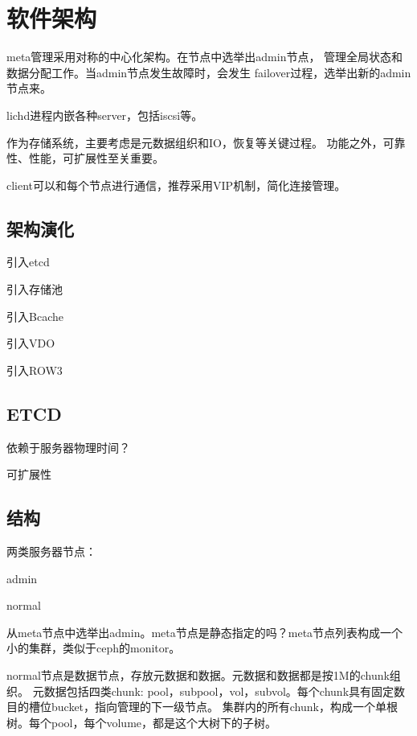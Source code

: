 \chapter{软件架构}

meta管理采用对称的中心化架构。在节点中选举出admin节点，
管理全局状态和数据分配工作。当admin节点发生故障时，会发生
failover过程，选举出新的admin节点来。

lichd进程内嵌各种server，包括iscsi等。

作为存储系统，主要考虑是元数据组织和IO，恢复等关键过程。
功能之外，可靠性、性能，可扩展性至关重要。

client可以和每个节点进行通信，推荐采用VIP机制，简化连接管理。

\section{架构演化}

\begin{enumbox}
\item{引入etcd}
\item{引入存储池}
\item{引入Bcache}
\item{引入VDO}
\item{引入ROW3}
\end{enumbox}

\section{ETCD}

依赖于服务器物理时间？

可扩展性

\section{结构}

两类服务器节点：
\begin{compactenum}
\item admin
\item normal
\end{compactenum}

从meta节点中选举出admin。meta节点是静态指定的吗？meta节点列表构成一个小的集群，类似于ceph的monitor。

normal节点是数据节点，存放元数据和数据。元数据和数据都是按1M的chunk组织。
元数据包括四类chunk: pool，subpool，vol，subvol。每个chunk具有固定数目的槽位bucket，指向管理的下一级节点。
集群内的所有chunk，构成一个单根树。每个pool，每个volume，都是这个大树下的子树。


